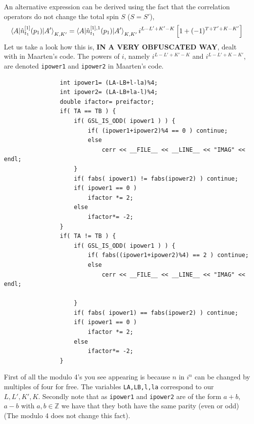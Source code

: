 \documentclass[10pt]{article}
\begin{document}
An alternative expression can be derived using the fact that the correlation operators do not change the total spin $S$ ($S=S'$),
\begin{align*}
	\braket{ A | \hat{n}_{t_1}^{[1]}(p_1) | A'}_{K,K'} = \braket{ A | \hat{n}_{t_1}^{[1],1}(p_1) | A'}_{K,K'} i^{L-L'+K'-K} \left[ 1 + (-1)^{T+T'+K-K'} \right]
\end{align*}
Let us take a look how this is, \textbf{IN A VERY OBFUSCATED WAY}, dealt with in Maarten's code.
The powers of $i$, namely $i^{L-L'+K'-K}$ and $i^{L-L'+K-K'}$, are denoted \texttt{ipower1} and \texttt{ipower2} in Maarten's code.
\begin{verbatim}
                int ipower1= (LA-LB+l-la)%4;
                int ipower2= (LA-LB+la-l)%4;
                double ifactor= preifactor;
                if( TA == TB ) {
                    if( GSL_IS_ODD( ipower1 ) ) {
                        if( (ipower1+ipower2)%4 == 0 ) continue;
                        else
                            cerr << __FILE__ << __LINE__ << "IMAG" << endl;
                    }
                    if( fabs( ipower1) != fabs(ipower2) ) continue;
                    if( ipower1 == 0 )
                        ifactor *= 2;
                    else
                        ifactor*= -2;
                }
                if( TA != TB ) {
                    if( GSL_IS_ODD( ipower1 ) ) {
                        if( fabs((ipower1+ipower2)%4) == 2 ) continue;
                        else
                            cerr << __FILE__ << __LINE__ << "IMAG" << endl;

                    }
                    if( fabs( ipower1) == fabs(ipower2) ) continue;
                    if( ipower1 == 0 )
                        ifactor *= 2;
                    else
                        ifactor*= -2;
                }
\end{verbatim}
First of all the modulo 4's you see appearing is because $n$ in $i^n$ can be changed by multiples of four for free. The variables \texttt{LA,LB,l,la} correspond to our $L,L',K',K$. Secondly note that as \texttt{ipower1} and \texttt{ipower2} are of the form $a+b$,$a-b$ with $a,b \in \mathds{Z}$ we have that they both have the same parity (even or odd) (The modulo 4 does not change this fact).
\end{document}
